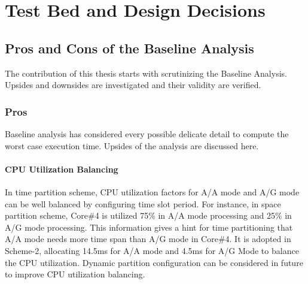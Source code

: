 \chapter{Test Bed and Design Decisions}
\label{chap:testbed}

\section{Pros and Cons of the Baseline Analysis}
\label{sec:mm:pros_n_cons}
The contribution of this thesis starts with scrutinizing the Baseline Analysis. Upsides and downsides are investigated and their validity are verified.
\subsection{Pros}
\label{mm:pros}
Baseline analysis has considered every possible delicate detail to compute the worst case execution time. Upsides of the analysis are discussed here.



\subsubsection{CPU Utilization Balancing}
In time partition scheme, CPU utilization factors for A/A mode and A/G mode can be well balanced by configuring time slot period. For instance, in space partition scheme, Core\#4 is utilized 75\% in A/A mode processing and 25\% in A/G mode processing. This information gives a hint for time partitioning that A/A mode needs more time span than A/G mode in Core\#4. It is adopted in Scheme-2, allocating 14.5ms for A/A mode and 4.5ms for A/G Mode to balance the CPU utilization. Dynamic partition configuration can be considered in future to improve CPU utilization balancing.

